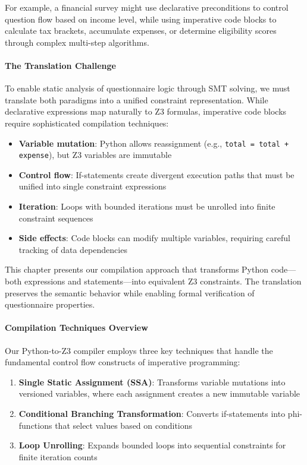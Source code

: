For example, a financial survey might use declarative preconditions to control question flow based on income level, while using imperative code blocks to calculate tax brackets, accumulate expenses, or determine eligibility scores through complex multi-step algorithms.

\paragraph{The Translation Challenge}

To enable static analysis of questionnaire logic through SMT solving, we must translate both paradigms into a unified constraint representation. While declarative expressions map naturally to Z3 formulas, imperative code blocks require sophisticated compilation techniques:

\begin{itemize}
    \item \textbf{Variable mutation}: Python allows reassignment (e.g., \texttt{total = total + expense}), but Z3 variables are immutable
    \item \textbf{Control flow}: If-statements create divergent execution paths that must be unified into single constraint expressions
    \item \textbf{Iteration}: Loops with bounded iterations must be unrolled into finite constraint sequences
    \item \textbf{Side effects}: Code blocks can modify multiple variables, requiring careful tracking of data dependencies
\end{itemize}

This chapter presents our compilation approach that transforms Python code—both expressions and statements—into equivalent Z3 constraints. The translation preserves the semantic behavior while enabling formal verification of questionnaire properties.

\paragraph{Compilation Techniques Overview}

Our Python-to-Z3 compiler employs three key techniques that handle the fundamental control flow constructs of imperative programming:

\begin{enumerate}
    \item \textbf{Single Static Assignment (SSA)}: Transforms variable mutations into versioned variables, where each assignment creates a new immutable variable
    \item \textbf{Conditional Branching Transformation}: Converts if-statements into phi-functions that select values based on conditions
    \item \textbf{Loop Unrolling}: Expands bounded loops into sequential constraints for finite iteration counts
\end{enumerate}

